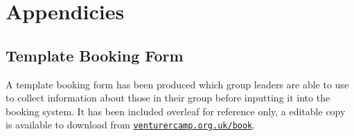 \documentclass[a4paper, 11pt]{report}
\begin{document}
    \tableofcontents
    
    
    
    

    \part*{Appendicies}
    \appendix
    

    \chapter{Template Booking Form}
    A template booking form has been produced which group leaders are able to use to collect information about those in their group before inputting it into the booking system. It has been included overleaf for reference only, a editable copy is available to download from \href{https://venturercamp.org.uk/book}{\texttt{venturercamp.org.uk/book}}.
    

    \backPage
\end{document}
